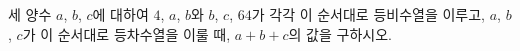 세 양수 $a$, $b$, $c$에 대하여 $4$, $a$, $b$와 $b$, $c$, $64$가 각각 이 순서대로 등비수열을 이루고, $a$, $b$, $c$가 이 순서대로 등차수열을 이룰 때, $a+b+c$의 값을 구하시오.
